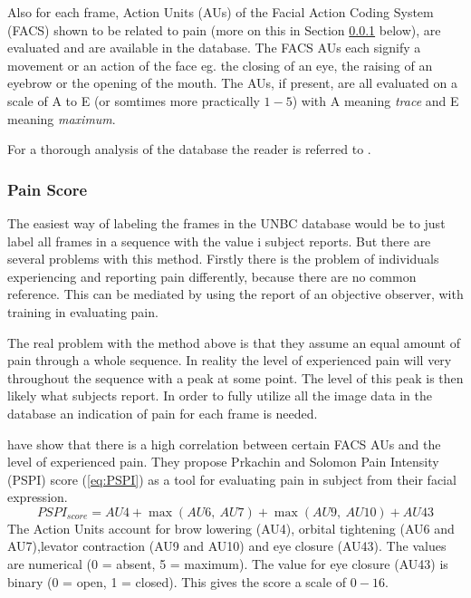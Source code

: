 \documentclass[Main]{subfiles}
\begin{document}
		Also for each frame, Action Units (AUs) of the Facial Action Coding System (FACS) \cite{Ekman1978} shown to be related to pain (more on this in Section \ref{ssub:pain_score} below), are evaluated and are available in the database. 
		The FACS AUs each signify a movement or an action of the face eg. the closing of an eye, the raising of an eyebrow or the opening of the mouth.
		The AUs, if present, are all evaluated on a scale of A to E (or somtimes more practically $1-5$) with A meaning \emph{trace} and E meaning \emph{maximum}.

		For a thorough analysis of the database the reader is referred to \cite{Lucey2012}.
		
		\subsubsection{Pain Score} %
			\label{ssub:pain_score}
			The easiest way of labeling the frames in the UNBC database would be to just label all frames in a sequence with the value i subject reports.
			But there are several problems with this method.
			Firstly there is the problem of individuals experiencing and reporting pain differently, because there are no common reference.
			This can be mediated by using the report of an objective observer, with training in evaluating pain.

			The real problem with the method above is that they assume an equal amount of pain through a whole sequence.
			In reality the level of experienced pain will very throughout the sequence with a peak at some point.
			The level of this peak is then likely what subjects report.
			In order to fully utilize all the image data in the database an indication of pain for each frame is needed.

			\citet{Prkachin1992} have show that there is a high correlation between certain FACS AUs and the level of experienced pain.
			They propose Prkachin and Solomon Pain Intensity (PSPI) score (\ref{eq:PSPI}) as a tool for evaluating pain in subject from their facial expression.
			\begin{equation}
				\label{eq:PSPI} 
				PSPI_{score} = 
					AU4 + \max(AU6,\ AU7) + \max(AU9,\ AU10) + AU43
			\end{equation}
			The Action Units account for brow lowering (AU4), orbital tightening (AU6 and AU7),levator contraction (AU9 and AU10) and eye closure (AU43).
			The values are numerical (0 = absent, 5 = maximum).
			The value for eye closure (AU43) is binary (0 = open, 1 = closed).
			This gives the score a scale of $0-16$.
\end{document}
